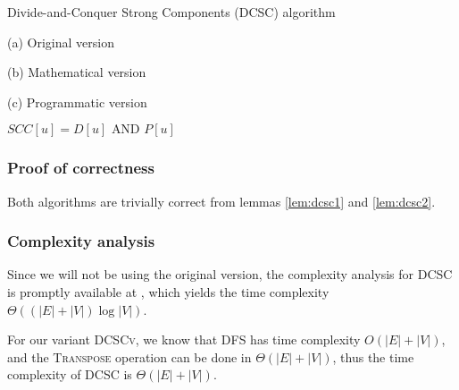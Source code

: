 \begin{algorithm}[H]
    \caption{Divide-and-Conquer Strong Components (DCSC) algorithm}
    \label{alg-dcsc}
    \begin{minipage}[t]{0.49\linewidth}
        (a) Original version
        \begin{algorithmic}[1]
                 
                 
                 
                \State {}
            \EndFunction
        \end{algorithmic}
    \end{minipage}
    \begin{minipage}[t]{0.49\linewidth}
        (b) Mathematical version
        \begin{algorithmic}[1]
                 
                 
                \State {}
            \EndFunction
        \end{algorithmic}
        (c) Programmatic version
        \begin{algorithmic}[1]
                 
                 
                 {$SCC[u] = D[u] \text{ AND } P[u]$}
                \EndFor
                \State {}
            \EndFunction
        \end{algorithmic}
    \end{minipage}
\end{algorithm}
\subsubsection{Proof of correctness}
Both algorithms are trivially correct from lemmas \ref{lem:dcsc1} and \ref{lem:dcsc2}.
\subsubsection{Complexity analysis}
Since we will not be using the original version, the complexity analysis for \textsc{DCSC} is promptly available at \cite{fleischer-dcsc}, which yields the time complexity $\Theta((|E|+|V|) \log |V|)$.\par
For our variant \textsc{DCSCv}, we know that \textsc{DFS} has time complexity $O(|E|+|V|)$, and the \textsc{Transpose} operation can be done in $\Theta(|E|+|V|)$, thus the time complexity of \textsc{DCSC} is $\Theta(|E|+|V|)$.
